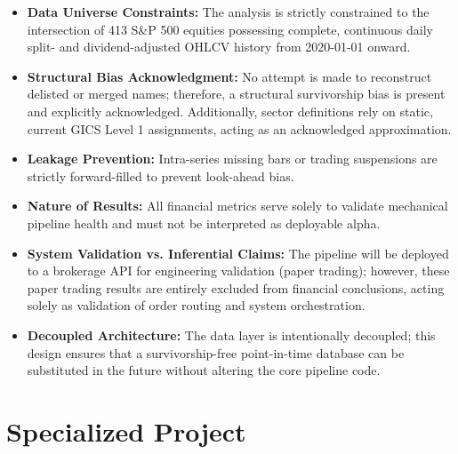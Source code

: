 \begin{itemize}
    \item \textbf{Data Universe Constraints:} The analysis is strictly constrained to the intersection of 413 S\&P 500 equities possessing complete, continuous daily split- and dividend-adjusted \ac{OHLCV} history from 2020-01-01 onward.
    \item \textbf{Structural Bias Acknowledgment:} No attempt is made to reconstruct delisted or merged names; therefore, a structural survivorship bias is present and explicitly acknowledged. Additionally, sector definitions rely on static, current \ac{GICS} Level 1 assignments, acting as an acknowledged approximation.
    \item \textbf{Leakage Prevention:} Intra-series missing bars or trading suspensions are strictly forward-filled to prevent look-ahead bias.
    \item \textbf{Nature of Results:} All financial metrics serve solely to validate mechanical pipeline health and must not be interpreted as deployable alpha.
    \item \textbf{System Validation vs. Inferential Claims:} The pipeline will be deployed to a brokerage API for engineering validation (paper trading); however, these paper trading results are entirely excluded from financial conclusions, acting solely as validation of order routing and system orchestration.
    \item \textbf{Decoupled Architecture:} The data layer is intentionally decoupled; this design ensures that a survivorship-free point-in-time database can be substituted in the future without altering the core pipeline code.
\end{itemize}

\section{Specialized Project}
